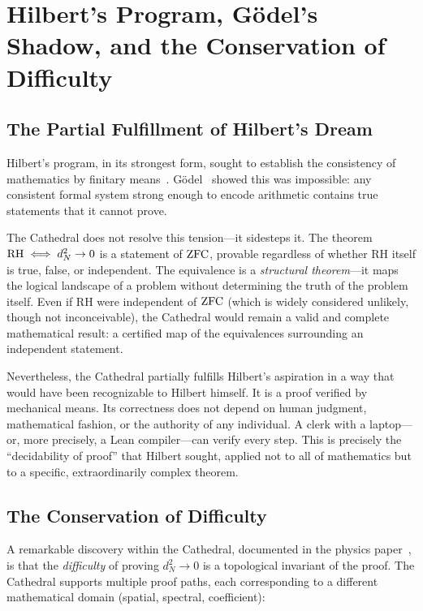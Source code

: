 \section{Hilbert's Program, G\"odel's Shadow, and the Conservation of Difficulty}
\label{sec:hilbert-godel}

\subsection{The Partial Fulfillment of Hilbert's Dream}

Hilbert's program, in its strongest form, sought to establish the
consistency of mathematics by finitary means~\cite{detlefsen1986}.
G\"odel~\cite{godel1931} showed this was impossible: any consistent
formal system strong enough to encode arithmetic contains true
statements that it cannot prove.

The Cathedral does not resolve this tension---it sidesteps it.
The theorem $\mathrm{RH} \iff d_N^2 \to 0$ is a statement of $\mathrm{ZFC}$,
provable regardless of whether RH itself is true, false, or
independent. The equivalence is a \emph{structural theorem}---it
maps the logical landscape of a problem without determining the
truth of the problem itself. Even if RH were independent of
$\mathrm{ZFC}$ (which is widely considered unlikely, though not
inconceivable), the Cathedral would remain a valid and complete
mathematical result: a certified map of the equivalences
surrounding an independent statement.

Nevertheless, the Cathedral partially fulfills Hilbert's
aspiration in a way that would have been recognizable to Hilbert
himself. It is a proof verified by mechanical means. Its
correctness does not depend on human judgment, mathematical
fashion, or the authority of any individual. A clerk with a
laptop---or, more precisely, a Lean compiler---can verify every
step. This is precisely the ``decidability of proof'' that
Hilbert sought, applied not to all of mathematics but to a
specific, extraordinarily complex theorem.

\subsection{The Conservation of Difficulty}

A remarkable discovery within the Cathedral, documented in
the physics paper~\cite{cathedral-physics}, is that the
\emph{difficulty} of proving $d_N^2 \to 0$ is a topological
invariant of the proof. The Cathedral supports multiple proof
paths, each corresponding to a different mathematical domain
(spatial, spectral, coefficient):

